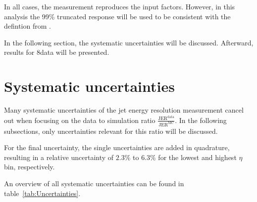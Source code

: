 In all cases, the measurement reproduces the input factors.
However, in this analysis the 99\% truncated response will be used to be consistent with the defintion from \cite{bib:CMS-AN-2010-076}.

In the following section, the systematic uncertainties will be discussed. 
Afterward, results for 8\tev data will be presented.



\FloatBarrier
\chapter{Systematic uncertainties}

Many systematic uncertainties of the jet energy resolution measurement cancel out when focusing on the data to simulation ratio $\frac{\text{JER}^{\text{data}}}{\text{JER}^{\text{MC}}}$.
In the following subsections, only uncertainties relevant for this ratio will be discussed.

For the final uncertainty, the single uncertainties are added in quadrature, 
resulting in a relative uncertainty of $2.3\%$ to $6.3\%$ for the lowest and highest $\eta$ bin, respectively. 

An overview of all systematic uncertainties can be found in \mbox{table \ref{tab:Uncertainties}}.


